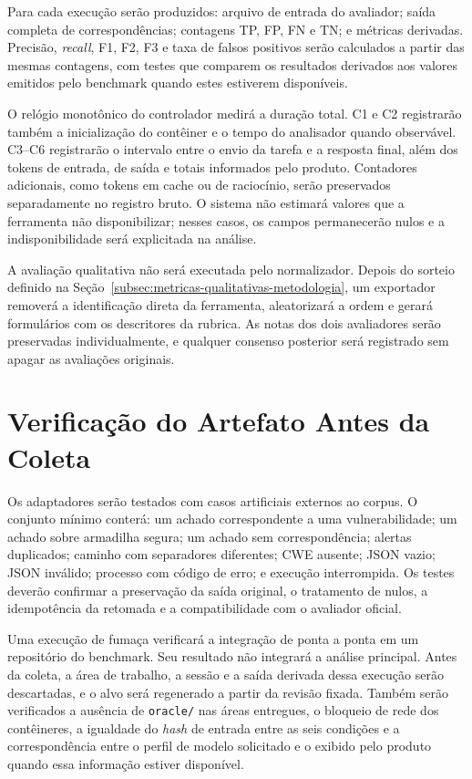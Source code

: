 Para cada execução serão produzidos: arquivo de entrada do avaliador; saída completa de correspondências; contagens TP, FP, FN e TN; e métricas derivadas. Precisão, \textit{recall}, F1, F2, F3 e taxa de falsos positivos serão calculados a partir das mesmas contagens, com testes que comparem os resultados derivados aos valores emitidos pelo benchmark quando estes estiverem disponíveis.

O relógio monotônico do controlador medirá a duração total. C1 e C2 registrarão também a inicialização do contêiner e o tempo do analisador quando observável. C3--C6 registrarão o intervalo entre o envio da tarefa e a resposta final, além dos tokens de entrada, de saída e totais informados pelo produto. Contadores adicionais, como tokens em cache ou de raciocínio, serão preservados separadamente no registro bruto. O sistema não estimará valores que a ferramenta não disponibilizar; nesses casos, os campos permanecerão nulos e a indisponibilidade será explicitada na análise.

A avaliação qualitativa não será executada pelo normalizador. Depois do sorteio definido na Seção~\ref{subsec:metricas-qualitativas-metodologia}, um exportador removerá a identificação direta da ferramenta, aleatorizará a ordem e gerará formulários com os descritores da rubrica. As notas dos dois avaliadores serão preservadas individualmente, e qualquer consenso posterior será registrado sem apagar as avaliações originais.

\section{Verificação do Artefato Antes da Coleta}\label{sec:verificacao-artefato-desenvolvimento}

Os adaptadores serão testados com casos artificiais externos ao corpus. O conjunto mínimo conterá: um achado correspondente a uma vulnerabilidade; um achado sobre armadilha segura; um achado sem correspondência; alertas duplicados; caminho com separadores diferentes; CWE ausente; JSON vazio; JSON inválido; processo com código de erro; e execução interrompida. Os testes deverão confirmar a preservação da saída original, o tratamento de nulos, a idempotência da retomada e a compatibilidade com o avaliador oficial.

Uma execução de fumaça verificará a integração de ponta a ponta em um repositório do benchmark. Seu resultado não integrará a análise principal. Antes da coleta, a área de trabalho, a sessão e a saída derivada dessa execução serão descartadas, e o alvo será regenerado a partir da revisão fixada. Também serão verificados a ausência de \texttt{oracle/} nas áreas entregues, o bloqueio de rede dos contêineres, a igualdade do \textit{hash} de entrada entre as seis condições e a correspondência entre o perfil de modelo solicitado e o exibido pelo produto quando essa informação estiver disponível.

